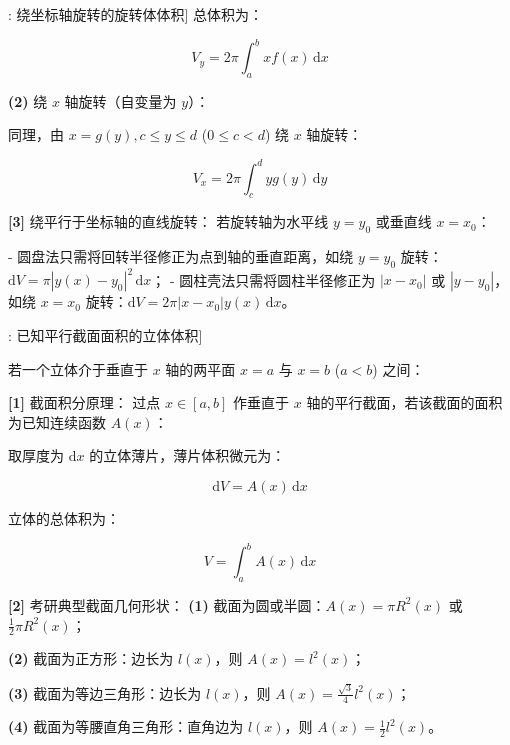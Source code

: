 \documentclass[11pt,a4paper,UTF8]{ctexart}
\begin{document}
\begin{thmbox}[公式[4]: 绕坐标轴旋转的旋转体体积]
总体积为：


\begin{equation*}
V_y = 2\pi \int_a^b x f(x)\,\mathrm{d}x
\end{equation*}


\textbf{(2)}  \textit{}绕 $x$ 轴旋转（自变量为 $y$）\textit{}：

同理，由 $x = g(y), c \leqslant y \leqslant d$ ($0 \leqslant c < d$) 绕 $x$ 轴旋转：


\begin{equation*}
V_x = 2\pi \int_c^d y g(y)\,\mathrm{d}y
\end{equation*}


\textbf{[3]} 绕平行于坐标轴的直线旋转：
若旋转轴为水平线 $y = y_0$ 或垂直线 $x = x_0$：

- 圆盘法只需将回转半径修正为点到轴的垂直距离，如绕 $y = y_0$ 旋转：$\mathrm{d}V = \pi |y(x) - y_0|^2\,\mathrm{d}x$；
- 圆柱壳法只需将圆柱半径修正为 $|x - x_0|$ 或 $|y - y_0|$，如绕 $x = x_0$ 旋转：$\mathrm{d}V = 2\pi |x - x_0| y(x)\,\mathrm{d}x$。

\end{thmbox}
\begin{thmbox}[公式[5]: 已知平行截面面积的立体体积]

若一个立体介于垂直于 $x$ 轴的两平面 $x = a$ 与 $x = b$ ($a < b$) 之间：

\textbf{[1]} 截面积分原理：
过点 $x \in [a, b]$ 作垂直于 $x$ 轴的平行截面，若该截面的面积为已知连续函数 $A(x)$：

取厚度为 $\mathrm{d}x$ 的立体薄片，薄片体积微元为：


\begin{equation*}
\mathrm{d}V = A(x)\,\mathrm{d}x
\end{equation*}


立体的总体积为：


\begin{equation*}
V = \int_a^b A(x)\,\mathrm{d}x
\end{equation*}


\textbf{[2]} 考研典型截面几何形状：
\textbf{(1)}  截面为圆或半圆：$A(x) = \pi R^2(x)$ 或 $\frac{1}{2}\pi R^2(x)$；

\textbf{(2)}  截面为正方形：边长为 $l(x)$，则 $A(x) = l^2(x)$；

\textbf{(3)}  截面为等边三角形：边长为 $l(x)$，则 $A(x) = \frac{\sqrt{3}}{4}l^2(x)$；

\textbf{(4)}  截面为等腰直角三角形：直角边为 $l(x)$，则 $A(x) = \frac{1}{2}l^2(x)$。

\end{thmbox}
\end{document}

